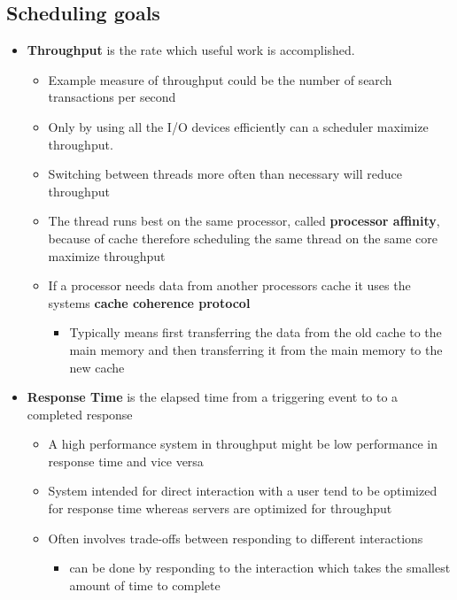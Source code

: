 \documentclass[11pt]{article}
\providecommand{\tightlist}{%
      \setlength{\itemsep}{0pt}\setlength{\parskip}{0pt}}
\begin{document}
    \subsection{Scheduling goals}\label{scheduling-goals}

\begin{itemize}
\tightlist
\item
  \textbf{Throughput} is the rate which useful work is accomplished.

  \begin{itemize}
  \tightlist
  \item
    Example measure of throughput could be the number of search
    transactions per second
  \item
    Only by using all the I/O devices efficiently can a scheduler
    maximize throughput.
  \item
    Switching between threads more often than necessary will reduce
    throughput
  \item
    The thread runs best on the same processor, called \textbf{processor
    affinity}, because of cache therefore scheduling the same thread on
    the same core maximize throughput
  \item
    If a processor needs data from another processors cache it uses the
    systems \textbf{cache coherence protocol}

    \begin{itemize}
    \tightlist
    \item
      Typically means first transferring the data from the old cache to
      the main memory and then transferring it from the main memory to
      the new cache
    \end{itemize}
  \end{itemize}
\item
  \textbf{Response Time} is the elapsed time from a triggering event to
  to a completed response

  \begin{itemize}
  \tightlist
  \item
    A high performance system in throughput might be low performance in
    response time and vice versa
  \item
    System intended for direct interaction with a user tend to be
    optimized for response time whereas servers are optimized for
    throughput
  \item
    Often involves trade-offs between responding to different
    interactions

    \begin{itemize}
    \tightlist
    \item
      can be done by responding to the interaction which takes the
      smallest amount of time to complete


\end{itemize}
\end{itemize}
\end{itemize}
\end{document}
